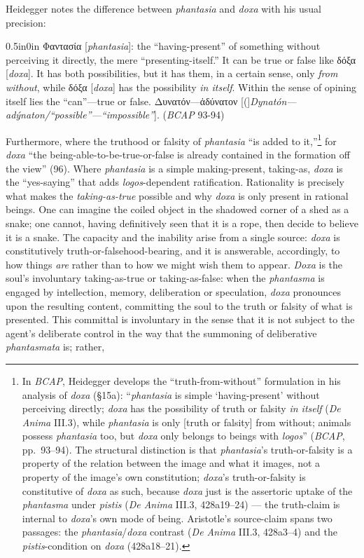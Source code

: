 \documentclass{article}
\newcommand{\gk}[1]{{\greekfont #1}}
\begin{document}
Heidegger notes the difference between \textit{phantasia} and \textit{doxa} with his usual precision: 
\begin{adjustwidth}{0.5in}{0in}
    \gk{Φαντασία} [\textit{phantasia}]: the ``having-present'' of something without perceiving it directly, the mere ``presenting-itself.'' It can be true or false like \gk{δόξα} [\textit{doxa}]. It has both possibilities, but it has them, in a certain sense, only \textit{from without}, while \gk{δόξα} [\textit{doxa}] has the possibility \textit{in itself}. Within the sense of opining itself lies the ``can''---true or false. \gk{Δυνατόν---ἀδύνατον} [(]\textit{Dynatón---adýnaton/``possible''---``impossible''}]. (\textit{BCAP} 93-94)
\end{adjustwidth}
Furthermore, where the truthood or falsity of \textit{phantasia} ``is added to it,''\footnote{In \textit{BCAP}, Heidegger develops the ``truth-from-without'' formulation in his analysis of \textit{doxa} (§15a): ``\textit{phantasia} is simple `having-present' without perceiving directly; \textit{doxa} has the possibility of truth or falsity \textit{in itself} (\textit{De Anima} III.3), while \textit{phantasia} is only [truth or falsity] from without; animals possess \textit{phantasia} too, but \textit{doxa} only belongs to beings with \textit{logos}'' (\textit{BCAP}, pp.~93--94). The structural distinction is that \textit{phantasia}'s truth-or-falsity is a property of the relation between the image and what it images, not a property of the image's own constitution; \textit{doxa}'s truth-or-falsity is constitutive of \textit{doxa} as such, because \textit{doxa} just is the assertoric uptake of the \textit{phantasma} under \textit{pistis} (\textit{De Anima} III.3, 428a19--24) --- the truth-claim is internal to \textit{doxa}'s own mode of being. Aristotle's source-claim spans two passages: the \textit{phantasia}/\textit{doxa} contrast (\textit{De Anima} III.3, 428a3--4) and the \textit{pistis}-condition on \textit{doxa} (428a18--21).} for \textit{doxa} ``the being-able-to-be-true-or-false is already contained in the formation off the view'' (96). Where \textit{phantasia} is a simple making-present, taking-as, \textit{doxa} is the ``yes-saying'' that adds \textit{logos}-dependent ratification. Rationality is precisely what makes the \textit{taking-as-true} possible and why \textit{doxa} is only present in rational beings. One can imagine the coiled object in the shadowed corner of a shed as a snake; one cannot, having definitively seen that it is a rope, then decide to believe it is a snake. The capacity and the inability arise from a single source: \textit{doxa} is constitutively truth-or-falsehood-bearing, and it is answerable, accordingly, to how things \textit{are} rather than to how we might wish them to appear. \textit{Doxa} is the soul's involuntary taking-as-true or taking-as-false: when the \textit{phantasma} is engaged by intellection, memory, deliberation or speculation, \textit{doxa} pronounces upon the resulting content, committing the soul to the truth or falsity of what is presented. This committal is involuntary in the sense that it is not subject to the agent's deliberate control in the way that the summoning of deliberative \textit{phantasmata} is; rather, 
\end{document}
